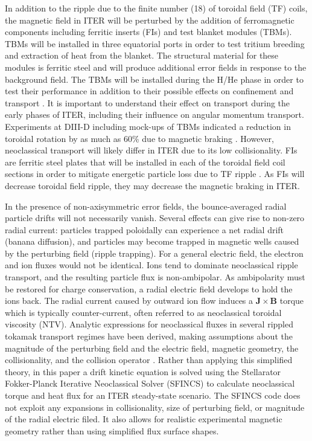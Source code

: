 \documentclass{article}
\numberwithin{figure}{section}
\numberwithin{equation}{section}
\begin{document}
In addition to the ripple due to the finite number (18) of toroidal field (TF) coils, the magnetic field in ITER will be perturbed by the addition of ferromagnetic components including ferritic inserts (FIs) and test blanket modules (TBMs). TBMs will be installed in three equatorial ports in order to test tritium breeding and extraction of heat from the blanket. The structural material for these modules is ferritic steel and will produce additional error fields in response to the background field. The TBMs will be installed during the H/He phase in order to test their performance in addition to their possible effects on confinement and transport \cite{Chuyanov2010}. It is important to understand their effect on transport during the early phases of ITER, including their influence on angular momentum transport. Experiments at DIII-D including mock-ups of TBMs indicated a reduction in toroidal rotation by as much as 60\% due to magnetic braking \cite{Schaffer2011}. However, neoclassical transport will likely differ in ITER due to its low collisionality. FIs are ferritic steel plates that will be installed in each of the toroidal field coil sections in order to mitigate energetic particle loss due to TF ripple \cite{Tobita2003}. As FIs will decrease toroidal field ripple, they may decrease the magnetic braking in ITER. 

In the presence of non-axisymmetric error fields, the bounce-averaged radial particle drifts will not necessarily vanish. Several effects can give rise to non-zero radial current: particles trapped poloidally can experience a net radial drift (banana diffusion), and particles may become trapped in magnetic wells caused by the perturbing field (ripple trapping). For a general electric field, the electron and ion fluxes would not be identical. Ions tend to dominate neoclassical ripple transport, and the resulting particle flux is non-ambipolar. As ambipolarity must be restored for charge conservation, a radial electric field develops to hold the ions back. The radial current caused by outward ion flow induces a $\bm{J} \times \bm{B}$ torque which is typically counter-current, often referred to as neoclassical toroidal viscosity (NTV). Analytic expressions for neoclassical fluxes in several rippled tokamak transport regimes have been derived, making assumptions about the magnitude of the perturbing field and the electric field, magnetic geometry, the collisionality, and the collision operator \cite{Shaing2003, Shaing2008, Shaing2010}. Rather than applying this simplified theory, in this paper a drift kinetic equation is solved using the Stellarator Fokker-Planck Iterative Neoclassical Solver (SFINCS) \cite{Landreman2014} to calculate neoclassical torque and heat flux for an ITER steady-state scenario. The SFINCS code does not exploit any expansions in collisionality, size of perturbing field, or magnitude of the radial electric filed. It also allows for realistic experimental magnetic geometry rather than using simplified flux surface shapes. 
\end{document}
